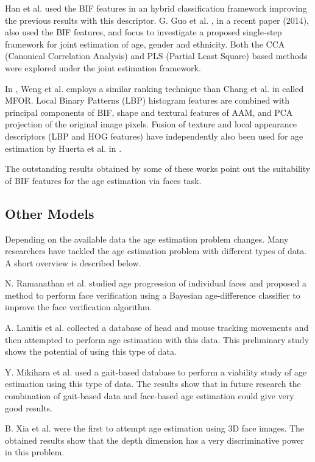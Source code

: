 Han et al. \cite{han:age} used the BIF features in an hybrid classification framework improving the previous results with this descriptor. G. Guo et al. \cite{Guo2014761}, in a recent paper (2014), also used the BIF features, and focus to investigate a proposed single-step framework for joint estimation of age, gender and ethnicity. Both the CCA (Canonical Correlation Analysis) \cite{hotelling1936relations} and PLS (Partial Least Square) based methods were explored under the joint estimation framework.

In \cite{6553772}, Weng et al. employs a similar ranking technique than Chang et al. in \cite{5995437} called MFOR. Local Binary Patterns (LBP) histogram features are combined with principal components of BIF, shape and textural features of AAM, and PCA projection of the original image pixels. Fusion of texture and local appearance descriptors (LBP and HOG features) have independently also been used for age estimation by Huerta et al. in \cite{HuFerPra14}.

The outstanding results obtained by some of these works point out the suitability of BIF features for the age estimation via faces task.

\subsection{Other Models}

Depending on the available data the age estimation problem changes. Many researchers have tackled the age estimation problem with different types of data. A short overview is described below.

N. Ramanathan et al. \cite{1709980} studied age progression of individual faces and proposed a method to perform face verification using a Bayesian age-difference classifier to improve the face verification algorithm.

A. Lanitis et al. \cite{5463396} collected a database of head and mouse tracking movements and then attempted to perform age estimation with this data. This preliminary study shows the potential of using this type of data.

Y. Mikihara et al. \cite{6117531} used a gait-based database to perform a viability study of age estimation using this type of data. The results show that in future research the combination of gait-based data and face-based age estimation could give very good results.

B. Xia et al. \cite{xia:hal-00904007} were the first to attempt age estimation using 3D face images. The obtained results show that the depth dimension has a very discriminative power in this problem. 

